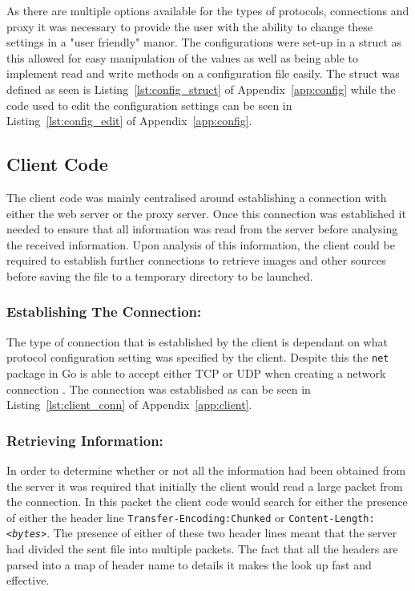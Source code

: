 \documentclass[10pt,twocolumn]{witseiepaper}
\begin{document}
		As there are multiple options available for the types of protocols, connections and proxy it was necessary to provide the user with the ability to change these settings in a "user friendly" manor. The configurations were set-up in a struct as this allowed for easy manipulation of the values as well as being able to implement read and write methods on a configuration file easily. The struct was defined as seen is Listing~\ref{lst:config_struct} of Appendix~\ref{app:config} while the code used to edit the configuration settings can be seen in Listing~\ref{lst:config_edit} of Appendix~\ref{app:config}. 
		
		
	\subsection{Client Code}
		
		The client code was mainly centralised around establishing a connection with either the web server or the proxy server. Once this connection was established it needed to ensure that all information was read from the server before analysing the received information. Upon analysis of this information, the client could be required to establish further connections to retrieve images and other sources before saving the file to a temporary directory to be launched. \\
		
		\subsubsection*{Establishing The Connection:} The type of connection that is established by the client is dependant on what protocol configuration setting was specified by the client. Despite this the \texttt{net} package in Go is able to accept either TCP or UDP when creating a network connection \cite{net}. The connection was established as can be seen in Listing~\ref{lst:client_conn} of Appendix~\ref{app:client}. 
		
		\subsubsection*{Retrieving Information:} In order to determine whether or not all the information had been obtained from the server it was required that initially the client would read a large packet from the connection. In this packet the client code would search for either the presence of either the header line \texttt{Transfer-Encoding:Chunked} or \texttt{Content-Length:\textit{<bytes>}}. The presence of either of these two header lines meant that the server had divided the sent file into multiple packets. The fact that all the headers are parsed into a map of header name to details it makes the look up fast and effective. \\
		
\end{document}
